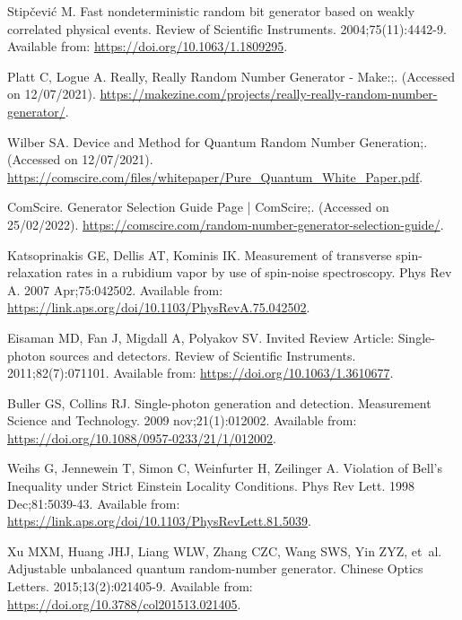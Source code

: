 \documentclass[]{interact}
\theoremstyle{plain}%
\theoremstyle{definition}
\theoremstyle{remark}
\begin{document}
\begin{thebibliography}{100}
Stipčević M.
\newblock Fast nondeterministic random bit generator based on weakly correlated
  physical events.
\newblock Review of Scientific Instruments. 2004;75(11):4442-9.
\newblock Available from: \url{https://doi.org/10.1063/1.1809295}.

Platt C, Logue A. Really, Really Random Number Generator - Make:;.
\newblock (Accessed on 12/07/2021).
\newblock
  \url{https://makezine.com/projects/really-really-random-number-generator/}.

Wilber SA. Device and Method for Quantum Random Number Generation;.
\newblock (Accessed on 12/07/2021).
\newblock
  \url{https://comscire.com/files/whitepaper/Pure_Quantum_White_Paper.pdf}.

ComScire. Generator Selection Guide Page | ComScire;.
\newblock (Accessed on 25/02/2022).
\newblock \url{https://comscire.com/random-number-generator-selection-guide/}.

Katsoprinakis GE, Dellis AT, Kominis IK.
\newblock Measurement of transverse spin-relaxation rates in a rubidium vapor
  by use of spin-noise spectroscopy.
\newblock Phys Rev A. 2007 Apr;75:042502.
\newblock Available from:
  \url{https://link.aps.org/doi/10.1103/PhysRevA.75.042502}.

Eisaman MD, Fan J, Migdall A, Polyakov SV.
\newblock Invited Review Article: Single-photon sources and detectors.
\newblock Review of Scientific Instruments. 2011;82(7):071101.
\newblock Available from: \url{https://doi.org/10.1063/1.3610677}.

Buller GS, Collins RJ.
\newblock Single-photon generation and detection.
\newblock Measurement Science and Technology. 2009 nov;21(1):012002.
\newblock Available from: \url{https://doi.org/10.1088/0957-0233/21/1/012002}.

Weihs G, Jennewein T, Simon C, Weinfurter H, Zeilinger A.
\newblock Violation of Bell's Inequality under Strict Einstein Locality
  Conditions.
\newblock Phys Rev Lett. 1998 Dec;81:5039-43.
\newblock Available from:
  \url{https://link.aps.org/doi/10.1103/PhysRevLett.81.5039}.

Xu MXM, Huang JHJ, Liang WLW, Zhang CZC, Wang SWS, Yin ZYZ, et~al.
\newblock Adjustable unbalanced quantum random-number generator.
\newblock Chinese Optics Letters. 2015;13(2):021405-9.
\newblock Available from: \url{https://doi.org/10.3788/col201513.021405}.


\end{thebibliography}
\end{document}
